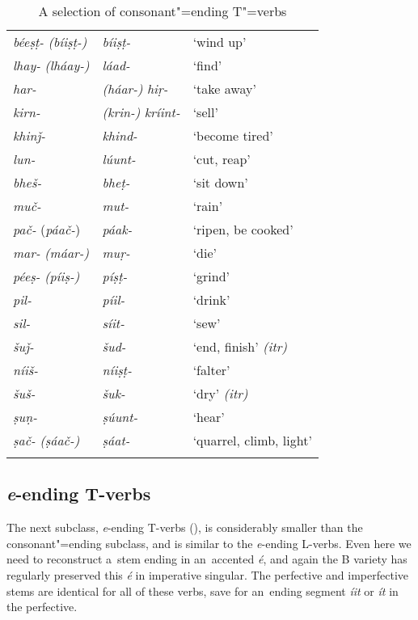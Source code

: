 \begin{table}[p]
\caption{A selection of consonant"=ending T"=verbs}
\begin{tabularx}{\textwidth}{ l@{\hspace{40pt}} l@{\hspace{40pt}} Q }
\lsptoprule
\textit{béeṣṭ-} \textit{(bíiṣṭ-)} &
\textit{bíiṣṭ-}	&
`wind up' \\
\textit{lhay-} \textit{(lháay-)}	&
\textit{láad-}	&
`find' \\
\textit{har-} &
\textit{(háar-)}	\textit{hiṛ-}	&
`take away' \\
\textit{kirn-} &
\textit{(krin-)} \textit{kríint-}	&
`sell' \\
\textit{khinǰ-}&
\textit{khind-}	&
`become tired' \\
\textit{lun-} &
\textit{lúunt-}	&
`cut, reap' \\
\textit{bheš-} &
\textit{bheṭ-}	&
`sit down' \\
\textit{muč-} &
\textit{mut-}	&
`rain' \\
\textit{\textit{pač-}} (\textit{páač-})	&
\textit{páak-}	&
`ripen, be cooked' \\
\textit{mar-} \textit{(máar-)}&
\textit{muṛ-}	&
`die' \\
\textit{péeṣ-} \textit{(píiṣ-)} &
\textit{píṣṭ-}	&
`grind' \\
\textit{pil-} &\textit{píil-}	&
`drink' \\
\textit{sil-} &\textit{síit-}	&
`sew' \\
\textit{šuǰ-} &\textit{šud-}	&
`end, finish' \textit{(itr)}\\
\textit{níiš-} &\textit{níiṣṭ-}	&
`falter' \\
\textit{šuš-} &\textit{šuk-}	&
`dry'  \textit{(itr)} \\
\textit{ṣuṇ-} &\textit{ṣúunt-}	&
`hear' \\
\textit{ṣač-} \textit{(ṣáač-)} &	\textit{ṣáat-}	&
`quarrel, climb, light' \\\lspbottomrule
\end{tabularx}
\label{tab:8-tc}
\end{table}

\subsection{\textit{e}-ending T-verbs}
\label{subsec:8-3-6}


The next subclass, \textit{e}-ending T-verbs (), is considerably smaller than the consonant"=ending subclass, and is similar to the \textit{e}-ending L-verbs. Even here we need to reconstruct a~stem ending in an~accented \textit{é}, and again the B variety has regularly preserved this \textit{é} in imperative singular. The perfective and imperfective stems are identical for all of these verbs, save for an~ending segment \textit{íit} or \textit{ít} in the perfective.


